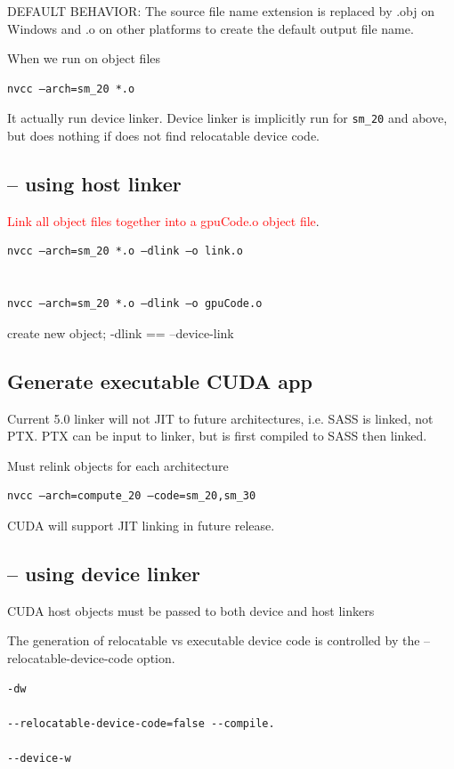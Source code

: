 DEFAULT BEHAVIOR: The source file name extension is replaced by .obj on Windows
and .o on other platforms to create the default output file name.

When we run on object files
\begin{verbatim}
nvcc –arch=sm_20 *.o
\end{verbatim}
It actually run device linker.
Device linker is implicitly run for \verb!sm_20! and above, but does nothing if
does not find relocatable device code.

\subsection{-- using host linker}
\textcolor{red}{Link all object files together into a gpuCode.o object file}.

\begin{verbatim}
nvcc –arch=sm_20 *.o –dlink –o link.o


nvcc –arch=sm_20 *.o –dlink –o gpuCode.o
\end{verbatim}
create new object; -dlink == --device-link


\subsection{Generate executable CUDA app}

Current 5.0 linker will not JIT to future architectures, i.e. SASS is linked, not PTX.
PTX can be input to linker, but is first compiled to SASS then linked.

Must relink objects for each architecture
\begin{verbatim}
nvcc –arch=compute_20 –code=sm_20,sm_30
\end{verbatim}

CUDA will  support JIT linking in future release.

\subsection{-- using device linker}

CUDA host objects must be passed to both device and host linkers

The generation of relocatable vs executable device code is controlled by the --relocatable-device-code option.

\begin{verbatim}
-dw

--relocatable-device-code=false --compile.

--device-w
\end{verbatim}

